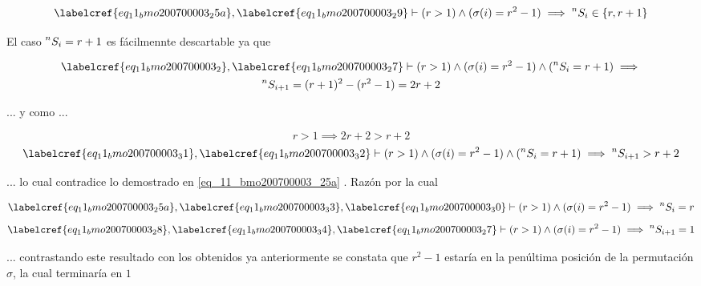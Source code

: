 \begin{equation} \label{eq_11_bmo200700003_30}
	\labelcref{eq_11_bmo200700003_25a}, \labelcref{eq_11_bmo200700003_29} \vdash (r>1) \land (\sigma(i) = r^2-1) \implies \prescript{n}{}{S_i} \in \{r, r+1\}
\end{equation}

El caso $\prescript{n}{}{S_i} = r+1$ es fácilmennte descartable ya que

\begin{equation} \label{eq_11_bmo200700003_31}
\begin{gathered}
	\labelcref{eq_11_bmo200700003_2}, \labelcref{eq_11_bmo200700003_27} \vdash (r>1) \land (\sigma(i) = r^2-1) \land (\prescript{n}{}{S_{i}} = r+1) \implies \\
	\prescript{n}{}{S_{i+1}} = (r+1)^2 - (r^2-1) = 2r+2
\end{gathered}
\end{equation}

... y como ...

\begin{equation} \label{eq_11_bmo200700003_32}
	r>1 \implies 2r+2 > r+2
\end{equation}
\begin{equation} \label{eq_11_bmo200700003_33}
	\labelcref{eq_11_bmo200700003_31}, \labelcref{eq_11_bmo200700003_32} \vdash (r>1) \land (\sigma(i) = r^2-1) \land (\prescript{n}{}{S_{i}} = r+1) \implies \prescript{n}{}{S_{i+1}} > r+2
\end{equation}

... lo cual contradice lo demostrado en \cref{eq_11_bmo200700003_25a} . Razón por la cual 

\begin{equation} \label{eq_11_bmo200700003_34}
	\labelcref{eq_11_bmo200700003_25a}, \labelcref{eq_11_bmo200700003_33}, \labelcref{eq_11_bmo200700003_30} \vdash (r>1) \land (\sigma(i) = r^2-1) \implies \prescript{n}{}{S_{i}} = r
\end{equation}
\begin{equation} \label{eq_11_bmo200700003_35}
	\labelcref{eq_11_bmo200700003_28}, \labelcref{eq_11_bmo200700003_34}, \labelcref{eq_11_bmo200700003_27} \vdash (r>1) \land (\sigma(i) = r^2-1) \implies \prescript{n}{}{S_{i+1}} = 1
\end{equation}

... contrastando este resultado con los obtenidos ya anteriormente se constata que $r^2-1$ estaría en la penúltima posición de la permutación $\sigma$, la cual terminaría en $1$

